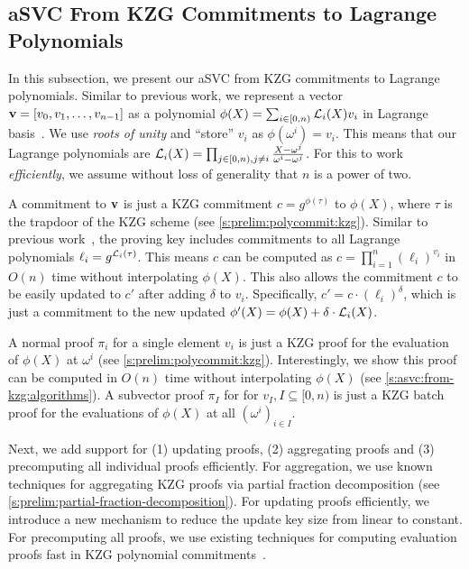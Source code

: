 \subsection{aSVC From KZG Commitments to Lagrange Polynomials}
\label{s:asvc:from-kzg}

In this subsection, we present our aSVC from KZG commitments to Lagrange polynomials.
Similar to previous work, we represent a vector $\bm{\mathrm{v}} = [v_0, v_1, \dots, v_{n-1}]$ as a polynomial $\phi(X)=\sum_{i\in[0,n)} \mathcal{L}_i(X)v_i$ in Lagrange basis~\cite{KZG10a,CDHK15,Tomescu20,GRWZ20}.
We use \textit{roots of unity} and ``store'' $v_i$ as $\phi(\omega^i)=v_i$.
This means that our Lagrange polynomials are $\mathcal{L}_i(X)=\prod_{j\in [0,n),j\ne i} \frac{X-\omega^j}{\omega^i - \omega^j}$.
For this to work \textit{efficiently}, we assume without loss of generality that $n$ is a power of two.

A commitment to $\bm{\mathrm{v}}$ is just a KZG commitment $c=g^{\phi(\tau)}$ to $\phi(X)$, where $\tau$ is the trapdoor of the KZG scheme (see \cref{s:prelim:polycommit:kzg}).
Similar to previous work~\cite{CDHK15}, the proving key includes commitments to all Lagrange polynomials $\ell_i = g^{\mathcal{L}_i(\tau)}$.
This means $c$ can be computed as $c=\prod_{i=1}^n (\ell_i)^{v_i}$ in $O(n)$ time without interpolating $\phi(X)$.
This also allows the commitment $c$ to be easily updated to $c'$ after adding $\delta$ to $v_i$.
Specifically, $c' = c\cdot (\ell_i)^{\delta}$, which is just a commitment to the new updated $\phi'(X)=\phi(X)+\delta\cdot\mathcal{L}_i(X)$.

A normal proof $\pi_i$ for a single element $v_i$ is just a KZG proof for the evaluation of $\phi(X)$ at $\omega^i$ (see \cref{s:prelim:polycommit:kzg}).
Interestingly, we show this proof can be computed in $O(n)$ time without interpolating $\phi(X)$ (see \cref{s:asvc:from-kzg:algorithms}).
A subvector proof $\pi_I$ for for $v_I,I\subseteq[0,n)$ is just a KZG batch proof for the evaluations of $\phi(X)$ at all $(\omega^i)_{i\in I}$.

Next, we add support for (1) updating proofs, (2) aggregating proofs and (3) precomputing all individual proofs efficiently.
For aggregation, we use known techniques for aggregating KZG proofs via partial fraction decomposition (see \cref{s:prelim:partial-fraction-decomposition}).
For updating proofs efficiently, we introduce a new mechanism to reduce the update key size from linear to constant.
For precomputing all proofs, we use existing techniques for computing evaluation proofs fast in KZG polynomial commitments~\cite{FK20}.

